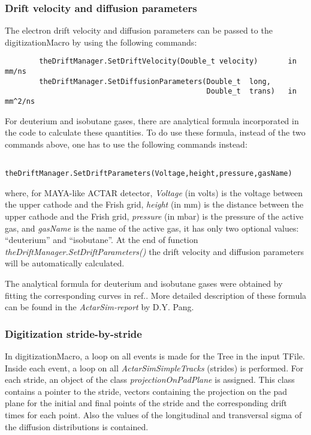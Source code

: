 \subsubsection{Drift velocity and diffusion parameters}
The electron drift velocity and diffusion parameters can be passed to the digitizationMacro by using the following commands:
\begin{verbatim}
        theDriftManager.SetDriftVelocity(Double_t velocity)       in mm/ns
        theDriftManager.SetDiffusionParameters(Double_t  long,
                                               Double_t  trans)   in mm^2/ns
\end{verbatim}

For deuterium and isobutane gases, there are analytical formula incorporated in the code to calculate these quantities. To do use these formula, instead of the two commands above, one has to use the following commands instead:
\begin{verbatim}
        theDriftManager.SetDriftParameters(Voltage,height,pressure,gasName)
\end{verbatim}
where, for MAYA-like ACTAR detector, \textit{Voltage} (in volts) is the voltage between the upper cathode and the Frish grid, \textit{height} (in mm) is the distance between the upper cathode and the Frish grid, \textit{pressure} (in mbar) is the pressure of the active gas, and \textit{gasName} is the name of the active gas, it has only two optional values: ``deuterium'' and ``isobutane''. At the end of function \textit{theDriftManager.SetDriftParameters()} the drift velocity and diffusion parameters will be automatically calculated.

The analytical formula for deuterium and isobutane gases were obtained by fitting the corresponding curves in ref.\cite{Peisert-Sauli}. More detailed description of these formula can be found in the \textit{ActarSim-report} by D.Y. Pang.

\subsubsection{Digitization stride-by-stride}
In digitizationMacro, a loop on all events is made for the Tree in the input TFile. Inside each event, a loop on all \textit{ActarSimSimpleTracks} (strides) is performed. For each stride, an object of the class \textit{projectionOnPadPlane} is assigned. This class contains a pointer to the stride, vectors containing the projection on the pad plane for the initial and final points of the stride and the corresponding drift times for each point. Also the values of the longitudinal and transversal sigma of the diffusion distributions is contained.

